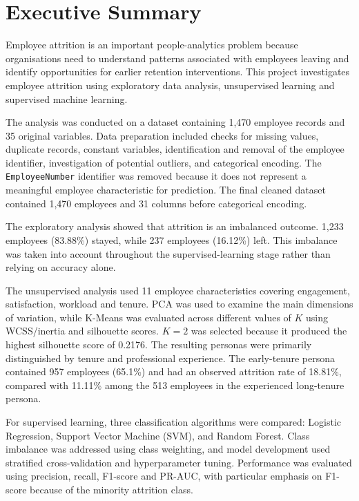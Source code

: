 \documentclass[11pt]{article}
\begin{document}
\section{Executive Summary}

Employee attrition is an important people-analytics problem because organisations need to understand patterns associated with employees leaving and identify opportunities for earlier retention interventions. This project investigates employee attrition using exploratory data analysis, unsupervised learning and supervised machine learning.

The analysis was conducted on a dataset containing 1,470 employee records and 35 original variables. Data preparation included checks for missing values, duplicate records, constant variables, identification and removal of the employee identifier, investigation of potential outliers, and categorical encoding. The \texttt{EmployeeNumber} identifier was removed because it does not represent a meaningful employee characteristic for prediction. The final cleaned dataset contained 1,470 employees and 31 columns before categorical encoding.

The exploratory analysis showed that attrition is an imbalanced outcome. 1,233 employees (83.88\%) stayed, while 237 employees (16.12\%) left. This imbalance was taken into account throughout the supervised-learning stage rather than relying on accuracy alone.

The unsupervised analysis used 11 employee characteristics covering engagement, satisfaction, workload and tenure. PCA was used to examine the main dimensions of variation, while K-Means was evaluated across different values of $K$ using WCSS/inertia and silhouette scores. $K=2$ was selected because it produced the highest silhouette score of 0.2176. The resulting personas were primarily distinguished by tenure and professional experience. The early-tenure persona contained 957 employees (65.1\%) and had an observed attrition rate of 18.81\%, compared with 11.11\% among the 513 employees in the experienced long-tenure persona.

For supervised learning, three classification algorithms were compared: Logistic Regression, Support Vector Machine (SVM), and Random Forest. Class imbalance was addressed using class weighting, and model development used stratified cross-validation and hyperparameter tuning. Performance was evaluated using precision, recall, F1-score and PR-AUC, with particular emphasis on F1-score because of the minority attrition class.
\end{document}
